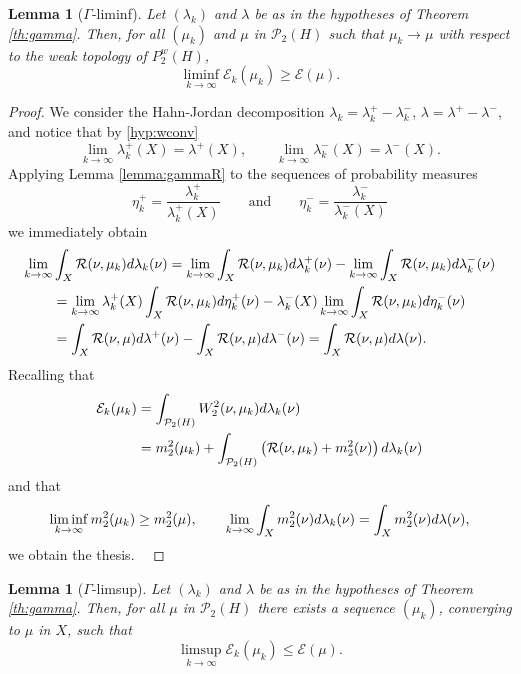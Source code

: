 \documentclass[12pt,a4paper]{article}
\renewcommand{\d}{{\rm d}}
\newcommand{\X}{\mathcal{P}_2(H)}
\theoremstyle{plain}
\newtheorem{lemma}[theorem]{Lemma}
\theoremstyle{definition}
\begin{document}
\begin{lemma}[$\Gamma$-liminf]
\label{lemma:gammainf}
Let $(\lambda_k)$ and $\lambda$ be as in the hypotheses of Theorem \ref{th:gamma}. Then, for all $(\mu_k)$ and $\mu$ in $\X$ such that $\mu_k \to \mu$ with respect to the weak topology of $P_2^w(H)$,
\[
	\liminf_{k \to \infty} \mathcal{E}_k(\mu_k) \geq \mathcal{E}(\mu).
\]
\end{lemma}
\begin{proof}
We consider the Hahn-Jordan decomposition $\lambda_k=\lambda^+_k-\lambda^-_k$, $\lambda=\lambda^+-\lambda^-$, and notice that by \eqref{hyp:wconv}
\[
	\lim_{k \to \infty}\lambda^+_k(X)= \lambda^+(X),\qquad \lim_{k \to \infty}\lambda^-_k(X)= \lambda^-(X).
\]
Applying Lemma \ref{lemma:gammaR} to the sequences of probability measures
\[
	\eta^+_k=\frac{\lambda^+_k}{\lambda^+_k(X)}\qquad \text{and}\qquad \eta^-_k=\frac{\lambda^-_k}{\lambda^-_k(X)}
\]	 
we immediately obtain
\begin{align*}
	\lim_{k \to \infty}  &\int_X \mathcal{R}(\nu,\mu_k) \d \lambda_k(\nu) = 	\lim_{k \to \infty}  \int_X \mathcal{R}(\nu,\mu_k) \d \lambda^+_k(\nu) -	\lim_{k \to \infty}  \int_X \mathcal{R}(\nu,\mu_k) \d \lambda^-_k(\nu) \\
	&= \lim_{k \to \infty}  \lambda^+_k(X)\int_X \mathcal{R}(\nu,\mu_k) \d \eta^+_k(\nu) -	\lambda^-_k(X)\lim_{k \to \infty}  \int_X \mathcal{R}(\nu,\mu_k) \d \eta^-_k(\nu)\\
	&=  \int_X \mathcal{R}(\nu,\mu) \d \lambda^+(\nu) -	  \int_X \mathcal{R}(\nu,\mu) \d \lambda^-(\nu) = \int_X \mathcal{R}(\nu,\mu) \d \lambda(\nu).
\end{align*}
Recalling that
\begin{align*}
	\mathcal{E}_k(\mu_k)&= \int_{\X} W_2^2(\nu,\mu_k)\d\lambda_k(\nu) \\
		&=m_2^2(\mu_k) + \int_{\X} \left(\mathcal R(\nu,\mu_k) +m_2^2(\nu)\right)\d\lambda_k(\nu)
\end{align*}
    and that 
    \[
    \liminf_{k \to \infty} m_2^2(\mu_k) \geq m_2^2(\mu), \qquad \lim_{k\to \infty} \int_X m_2^2(\nu) \d \lambda_k(\nu) = \int_X m_2^2(\nu) \d \lambda (\nu),
    \]
    we obtain the thesis.
\
\end{proof}
\begin{lemma}[$\Gamma$-limsup]
\label{lemma:gammasup}
Let $(\lambda_k)$ and $\lambda$ be as in the hypotheses of Theorem \ref{th:gamma}. Then, for all  $\mu$ in $\X$ there exists a sequence $(\mu_k)$, converging to $\mu$ in $X$, such that
\[
	\limsup_{k \to \infty} \mathcal{E}_k(\mu_k) \leq \mathcal{E}(\mu).
\]
\end{lemma}
\end{document}
